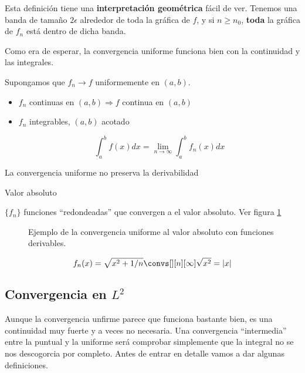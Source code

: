 		Esta definición tiene una \textbf{interpretación geométrica} fácil de ver. Tenemos una banda de tamaño $2\epsilon$ alrededor de toda la gráfica de $f$, y si $n \geq n_0$, {\bf toda} la gráfica de $f_n$ está dentro de dicha banda.

		Como era de esperar, la convergencia uniforme funciona bien con la continuidad y las integrales.

		\begin{theorem}

			Supongamos que $f_n \rightarrow f$ uniformemente en $(a,b)$.

			\begin{itemize}
				\item $f_n$ continuas en $(a,b) \Rightarrow f$ continua en $(a,b)$

				\item $f_n$ integrables, $(a,b)$ acotado

				\[\int^{b}_{a} f(x) dx = \lim_{n \rightarrow \infty} \int^{b}_{a} f_n(x) dx \]
			\end{itemize}

			\obs La convergencia uniforme no preserva la derivabilidad

		\end{theorem}

		\begin{example}{Valor absoluto}

			$\{f_n\}$ funciones ``redondeadas'' que convergen a el valor absoluto. Ver figura \ref{fig:convergenciaValorAbsoluto}

			\begin{figure}[thbp]
			\centering
			\caption{Ejemplo de la convergencia uniforme al valor absoluto con funciones derivables.}
			\label{fig:convergenciaValorAbsoluto}
			\end{figure}

			\[f_n(x) = \sqrt{x^2 + 1/n} \convs[][n][\infty] \sqrt{x^2} = |x| \]

		\end{example}

	\subsection{Convergencia en $L^2$}

		Aunque la convergencia unfirme parece que funciona bastante bien, es una continuidad muy fuerte y a veces no necesaria. Una convergencia ``intermedia'' entre la puntual y la uniforme será comprobar simplemente que la integral no se nos descogorcia por completo. Antes de entrar en detalle vamos a dar algunas definiciones.

